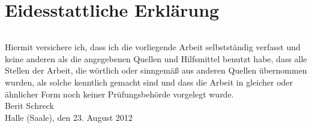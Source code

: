 \documentclass[fontsize=11pt, twoside, a4paper]{scrartcl}
\begin{document}
\section{Eidesstattliche Erklärung}
\begin{flushleft}
\begin{verbatim}

\end{verbatim}
Hiermit versichere ich, dass ich die vorliegende Arbeit selbstständig verfasst und keine anderen als die angegebenen Quellen und Hilfsmittel benutzt habe, dass alle Stellen der Arbeit, die wörtlich oder sinngemäß aus anderen Quellen übernommen wurden, als solche kenntlich gemacht sind und dass die Arbeit in gleicher oder ähnlicher Form noch keiner Prüfungsbehörde vorgelegt wurde.\\[4.0\baselineskip]
Berit Schreck\\
Halle (Saale), den 23. August 2012
\end{flushleft}
\end{document}
